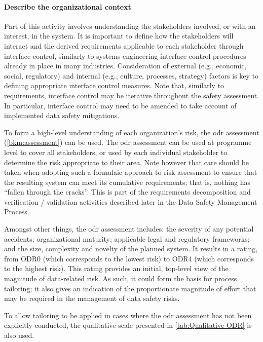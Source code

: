 \paragraph{Describe the organizational context}
Part of this activity involves understanding the \glspl{stakeholder} involved, or with an interest, in the system. It is important to define how the \glspl{stakeholder} will interact and the derived requirements applicable to each \gls{stakeholder} through interface control, similarly to systems engineering interface control procedures already in place in many industries. Consideration of external (e.g., economic, social, regulatory) and internal (e.g., culture, processes, strategy) factors is key to defining appropriate interface control measures. Note that, similarly to requirements, interface control may be iterative throughout the \gls{safety assessment}. In particular, interface control may need to be amended to take account of implemented data safety mitigations.

To form
a high-level understanding of each organization's risk,
the \gls{odr} assessment (\autoref{bkm:assessment}) can be used. The \gls{odr} assessment can be used at programme level to cover all \glspl{stakeholder}, or used by each individual \gls{stakeholder} to determine the
risk
appropriate to their area.
Note however that care should be taken when adopting such a formulaic approach to risk assessment
to ensure that the resulting system can meet its cumulative requirements; that is, nothing has ``fallen through the cracks''. This is part of the requirements decomposition and verification / validation activities described later in the Data Safety Management Process.

Amongst other things, the \gls{odr} assessment includes: the severity of any potential accidents; organizational maturity; applicable legal and regulatory frameworks; and the size, complexity and novelty of the planned system. It results in a rating, from ODR0 (which corresponds to the lowest risk) to ODR4 (which corresponds to the highest risk). This rating provides an initial, top-level view of the magnitude of data-related risk. As such, it
could form
the basis for process tailoring; it also
gives an indication of the proportionate magnitude of effort that may be required in the management of data safety risks.

To allow tailoring to be applied in cases where the \gls{odr} assessment has not been explicitly conducted, the qualitative scale presented in \autoref{tab:Qualitative-ODR} is also used.

